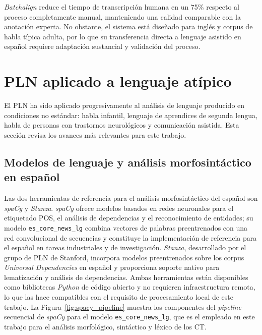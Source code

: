 \emph{Batchalign} reduce el tiempo de transcripción humana en un 75\% respecto al proceso
completamente manual, manteniendo una calidad comparable con la anotación experta. No
obstante, el sistema está diseñado para inglés y corpus de habla típica adulta, por lo
que su transferencia directa a lenguaje asistido en español requiere adaptación
sustancial y validación del proceso.


\newpage
\section{PLN aplicado a lenguaje atípico}
\label{sec:pln_atipico}

El \ac{PLN} ha sido aplicado progresivamente al análisis de lenguaje producido en
condiciones no estándar: habla infantil, lenguaje de aprendices de segunda lengua,
habla de personas con trastornos neurológicos y comunicación asistida. Esta sección
revisa los avances más relevantes para este trabajo.


\subsection{Modelos de lenguaje y análisis morfosintáctico en español}
\label{subsec:pln_espanol}

Las dos herramientas de referencia para el análisis morfosintáctico del español son
\emph{spaCy} \cite{lsa_swiss_benchmark} y \emph{Stanza}. \emph{spaCy} ofrece modelos basados
en redes neuronales para el etiquetado \ac{POS}, el análisis de dependencias y el
reconocimiento de entidades; su modelo \texttt{es\_core\_news\_lg} combina vectores de
palabras preentrenados con una red convolucional de secuencias y constituye la implementación
de referencia para el español en tareas industriales y de investigación. \emph{Stanza},
desarrollado por el grupo de \ac{PLN} de Stanford, incorpora modelos preentrenados sobre los
corpus \emph{Universal Dependencies} en español y proporciona soporte nativo para lematización
y análisis de dependencias. Ambas herramientas están disponibles como bibliotecas \emph{Python} de
código abierto y no requieren infraestructura remota, lo que las hace compatibles con el
requisito de procesamiento local de este trabajo. La Figura~\ref{fig:spacy_pipeline} muestra
los componentes del \emph{pipeline} secuencial de \emph{spaCy} para el modelo
\texttt{es\_core\_news\_lg}, que es el empleado en este trabajo para el análisis morfológico,
sintáctico y léxico de los \ac{CT}.

